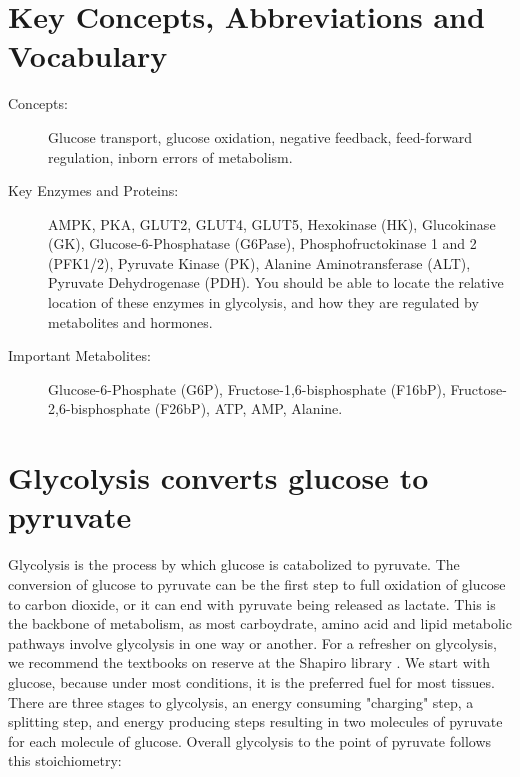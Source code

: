 \documentclass{tufte-handout}
\begin{document}
\section{Key Concepts, Abbreviations and Vocabulary}

\begin{description}
	\item[Concepts:] Glucose transport, glucose oxidation, negative feedback, feed-forward regulation, inborn errors of metabolism.  
	\item[Key Enzymes and Proteins:] AMPK, PKA, GLUT2, GLUT4, GLUT5, Hexokinase (HK), Glucokinase (GK), Glucose-6-Phosphatase (G6Pase), Phosphofructokinase 1 and 2 (PFK1/2), Pyruvate Kinase (PK), Alanine Aminotransferase (ALT), Pyruvate Dehydrogenase (PDH).  You should be able to locate the relative location of these enzymes in glycolysis, and how they are regulated by metabolites and hormones.
	\item[Important Metabolites:] Glucose-6-Phosphate (G6P), Fructose-1,6-bisphosphate (F16bP), Fructose-2,6-bisphosphate (F26bP), ATP, AMP, Alanine.

\end{description}

\pagebreak

\section{Glycolysis converts glucose to pyruvate}

Glycolysis is the process by which glucose is catabolized to pyruvate.  The conversion of glucose to pyruvate can be the first step to full oxidation of glucose to carbon dioxide, or it can end with pyruvate being released as lactate.  This is the backbone of metabolism, as most carboydrate, amino acid and lipid metabolic pathways involve glycolysis in one way or another.  For a refresher on glycolysis, we recommend the textbooks on reserve at the Shapiro library \citep{Berg2013,Ferrier2017}.  We start with glucose, because under most conditions, it is the preferred fuel for most tissues.  There are three stages to glycolysis, an energy consuming "charging" step, a splitting step, and energy producing steps resulting in two molecules of pyruvate for each molecule of glucose.  Overall glycolysis to the point of pyruvate follows this stoichiometry:
\end{document}
